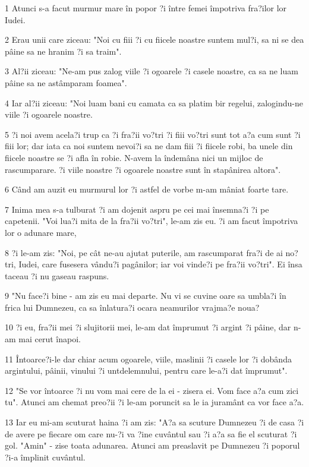 \par 1 Atunci s-a facut murmur mare în popor ?i între femei împotriva fra?ilor lor Iudei.
\par 2 Erau unii care ziceau: "Noi cu fiii ?i cu fiicele noastre suntem mul?i, sa ni se dea pâine sa ne hranim ?i sa traim".
\par 3 Al?ii ziceau: "Ne-am pus zalog viile ?i ogoarele ?i casele noastre, ca sa ne luam pâine sa ne astâmparam foamea".
\par 4 Iar al?ii ziceau: "Noi luam bani cu camata ca sa platim bir regelui, zalogindu-ne viile ?i ogoarele noastre.
\par 5 ?i noi avem acela?i trup ca ?i fra?ii vo?tri ?i fiii vo?tri sunt tot a?a cum sunt ?i fiii lor; dar iata ca noi suntem nevoi?i sa ne dam fiii ?i fiicele robi, ba unele din fiicele noastre se ?i afla în robie. N-avem la îndemâna nici un mijloc de rascumparare. ?i viile noastre ?i ogoarele noastre sunt în stapânirea altora".
\par 6 Când am auzit eu murmurul lor ?i astfel de vorbe m-am mâniat foarte tare.
\par 7 Inima mea s-a tulburat ?i am dojenit aspru pe cei mai însemna?i ?i pe capetenii. "Voi lua?i mita de la fra?ii vo?tri", le-am zis eu. ?i am facut împotriva lor o adunare mare,
\par 8 ?i le-am zis: "Noi, pe cât ne-au ajutat puterile, am rascumparat fra?i de ai no?tri, Iudei, care fusesera vându?i pagânilor; iar voi vinde?i pe fra?ii vo?tri". Ei însa taceau ?i nu gaseau raspuns.
\par 9 "Nu face?i bine - am zis eu mai departe. Nu vi se cuvine oare sa umbla?i în frica lui Dumnezeu, ca sa înlatura?i ocara neamurilor vrajma?e noua?
\par 10 ?i eu, fra?ii mei ?i slujitorii mei, le-am dat împrumut ?i argint ?i pâine, dar n-am mai cerut înapoi.
\par 11 Întoarce?i-le dar chiar acum ogoarele, viile, maslinii ?i casele lor ?i dobânda argintului, pâinii, vinului ?i untdelemnului, pentru care le-a?i dat împrumut".
\par 12 "Se vor întoarce ?i nu vom mai cere de la ei - zisera ei. Vom face a?a cum zici tu". Atunci am chemat preo?ii ?i le-am poruncit sa le ia juramânt ca vor face a?a.
\par 13 Iar eu mi-am scuturat haina ?i am zis: "A?a sa scuture Dumnezeu ?i de casa ?i de avere pe fiecare om care nu-?i va ?ine cuvântul sau ?i a?a sa fie el scuturat ?i gol. "Amin" - zise toata adunarea. Atunci am preaslavit pe Dumnezeu ?i poporul ?i-a împlinit cuvântul.
